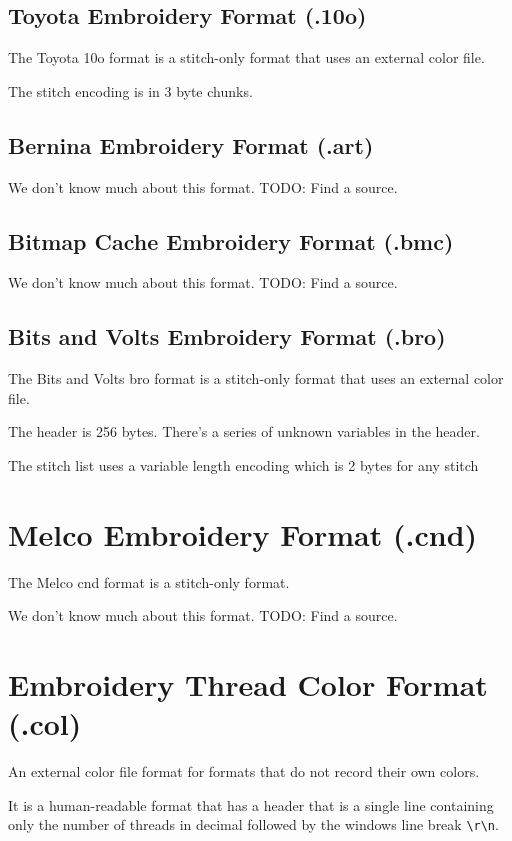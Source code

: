 \documentclass{report}
\begin{document}
\subsection{Toyota Embroidery Format (.10o)}

The Toyota 10o format is a stitch-only format that uses an external color file.

The stitch encoding is in 3 byte chunks.

\subsection{Bernina Embroidery Format (.art)}

We don't know much about this format. TODO: Find a source.

\subsection{Bitmap Cache Embroidery Format (.bmc)}

We don't know much about this format. TODO: Find a source.

\subsection{Bits and Volts Embroidery Format (.bro)}

The Bits and Volts bro format is a stitch-only format that uses an external color file.

The header is 256 bytes. There's a series of unknown variables in the header.

The stitch list uses a variable length encoding which is 2 bytes for any stitch

\section{Melco Embroidery Format (.cnd)}

The Melco cnd format is a stitch-only format.

We don't know much about this format. TODO: Find a source.

\section{Embroidery Thread Color Format (.col)}

An external color file format for formats that do not record their own colors. 

It is a human-readable format that has a header that is a single line containing only the number of threads in decimal followed by the windows line break \texttt{\textbackslash{}r\textbackslash{}n}.
\end{document}
